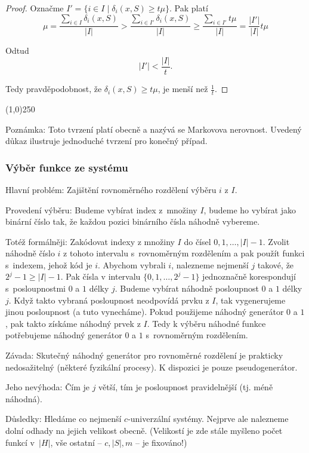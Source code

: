 \documentclass[a4paper,12pt]{article}
\newenvironment{myproof}{
  \begin{proof}
    
  }{
  \end{proof}
  \begin{center}
   \line(1,0){250}
   \end{center}
  }
\begin{document}
\begin{myproof}
Označme $I'=\{i\in I\mid\delta_i(x,S)\ge t\mu \}$. Pak platí
$$\mu =\frac {\sum_{i\in I}\delta_i(x,S)}{|I|}>\frac {\sum_{i\in 
I'}\delta_i(x,S)}{|I|}\ge\frac {\sum_{i\in I'}t\mu}{|I|}=\frac {|
I'|}{|I|}t\mu$$

Odtud
$$|I'|<\frac {|I|}t.$$

Tedy pravděpodobnost, že $\delta_i(x,S)\ge 
t\mu$, je menší 
než $\frac 1t$.
\end{myproof}


Poznámka: Toto tvrzení platí obecně a nazývá 
se Markovova nerovnost. Uvedený důkaz 
ilustruje jednoduché tvrzení pro ko\-neč\-ný případ.

\subsubsection{Výběr funkce ze systému}

Hlavní problém: Zajištění rovnoměrného rozdělení 
výběru $i$ z $I$.

Provedení výběru: Budeme vybírat index z~množiny $I$, budeme ho vybírat jako binární číslo tak, že každou pozici binárního čísla náhodně vybereme. 

Totéž formálněji: Zakódovat indexy z množiny $
I$ do 
čísel $0,1,\dots,|I|-1$. Zvolit náhodně číslo $
i$ z tohoto 
intervalu s~rovnoměrným rozdělením a pak použít 
funkci s~indexem, jehož kód je $i$. Abychom vybrali $i$, nalezneme 
nejmenší $j$ takové, že $2^j-1\ge |I|-1$. Pak čísla v 
intervalu $\{0,1,\dots,2^j-1\}$ jednoznačně korespondují s~posloupnostmi $0$ a $1$ délky $j$. Budeme vybírat náhodně 
posloupnost $0$ a $1$ délky $j$. Když takto vybraná posloupnost neodpovídá prvku z $I$, tak vygenerujeme jinou posloupnost (a tuto vynecháme). Pokud použijeme náhodný generátor $0$ a $1$, pak takto získáme náhodný prvek z $I$. Tedy k výběru náhodné funkce potřebujeme  
náhodný generátor $0$ a $1$ s~rovnoměrným rozděle\-ním.

Závada: Skutečný náhodný generátor pro 
rovnoměrné rozděle\-ní je prakticky nedosažitelný 
(některé fyzikální procesy). K dispozici je pouze 
pseudogenerátor. 

Jeho nevýhoda: Čím je $j$ větší, tím je 
posloupnost pravidelnější (tj. méně náhodná). 

Důsledky: Hledáme co nejmenší $c$-univerzální 
systémy. Nejprve ale nalezneme dolní odhady na jejich velikost obecně. (Velikostí je zde stále myšleno počet funkcí v~$|H|$, vše ostatní -- $c, |S|, m$ -- je fixováno!)
\end{document}
